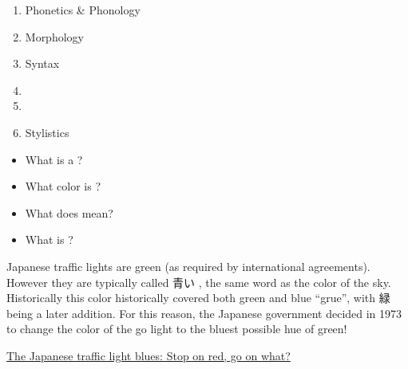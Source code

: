\documentclass[a4paper,landscape,headrule,footrule,xetex,25pt]{foils}
\begin{document}
\begin{enumerate}\addtolength{\itemsep}{-0.75ex}
\item Phonetics \& Phonology
\item Morphology
\item Syntax
\item {}
\item {}
\item Stylistics
\end{enumerate}


\begin{itemize}
\item What is a ?
\item What color is ?
\item What does  mean?
\item What is  ?
\end{itemize}

\newpage

Japanese traffic lights are green (as required by international
agreements).  However they are typically called 青い ,
the same word as the color of the sky.  Historically this color
historically covered both green and blue ``grue'',
with 緑  being a later addition.  For this reason,
the Japanese government decided in 1973 to change the color of the go
light to the bluest possible hue of green!


\href{https://www.japantimes.co.jp/life/2013/02/25/language/the-japanese-traffic-light-blues-stop-on-red-go-on-what/#.WRmAuuWGNPZ}{The Japanese traffic light blues: Stop on red, go on what?}
 

\end{document}
